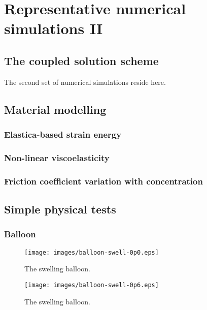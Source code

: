 \chapter{Representative numerical simulations II}
\label{numerical-simulations-2}

\section{The coupled solution scheme}
\label{coupled-solution-scheme-2}

The second set of numerical simulations reside here.

\section{Material modelling}
\label{material-modelling}

\subsection{Elastica-based strain energy}
\label{elastica-stain-energy}

\subsection{Non-linear viscoelasticity}
\label{non-linear-viscoelasticity}

\subsection{Friction coefficient variation with concentration}
\label{variable-friction-coefficient}

\section{Simple physical tests}
\label{simple-physics}

\subsection{Balloon}
\label{balloon}

\begin{figure}
\centering
{\texttt{[image: images/balloon-swell-0p0.eps]}}
\caption{The swelling balloon.} 
\label{swelling-balloon-image-0}
\end{figure}

\begin{figure}
\centering
{\texttt{[image: images/balloon-swell-0p6.eps]}}
\caption{The swelling balloon.} 
\label{swelling-balloon-image-1}
\end{figure}

